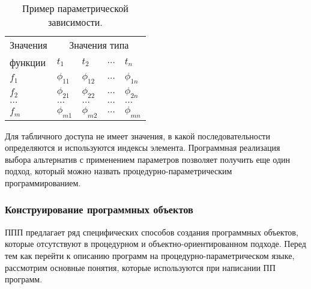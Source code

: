 \begin{table}[h!]
  \centering
  \begin{tabular}{|l|l|l|l|l|}
    \hline
    Значения & \multicolumn{4}{c|}{Значения типа}                                       \\\cline{2-5}
    функции  & $t_1$                              & $t_2$       & $\dots$ & $t_n$       \\\hline
    $f_1$    & $\phi_{11}$                        & $\phi_{12}$ & $\dots$ & $\phi_{1n}$ \\\hline
    $f_2$    & $\phi_{21}$                        & $\phi_{22}$ & $\dots$ & $\phi_{2n}$ \\\hline
    $\dots$  & $\dots$                            & $\dots$     & $\dots$ & $\dots$     \\\hline
    $f_m$    & $\phi_{m1}$                        & $\phi_{m2}$ & $\dots$ & $\phi_{mn}$ \\\hline
  \end{tabular}
  \caption{Пример параметрической зависимости.}
  \label{table:parametric}
\end{table}

Для табличного доступа не имеет значения, в какой последовательности определяются и используются индексы элемента. Программная реализация выбора альтернатив с применением параметров позволяет получить еще один подход, который можно назвать процедурно-параметрическим программированием.

\subsubsection{Конструирование программных объектов}

ППП предлагает ряд специфических способов создания программных объектов, которые отсутствуют в процедурном и объектно-ориентированном подходе.
Перед тем как перейти к описанию программ на процедурно-параметрическом языке, рассмотрим основные понятия, которые используются при написании ПП программ.


